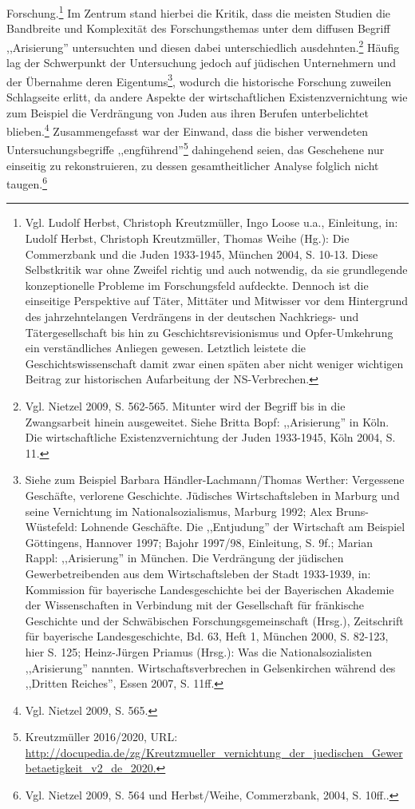 Forschung.\footnote{Vgl. Ludolf Herbst, Christoph Kreutzmüller, Ingo Loose u.a., Einleitung, in: Ludolf Herbst, Christoph Kreutzmüller, Thomas Weihe (Hg.): Die Commerzbank und die Juden 1933-1945, München 2004, S. 10-13. Diese Selbstkritik war ohne Zweifel richtig und auch notwendig, da sie grundlegende konzeptionelle Probleme im Forschungsfeld aufdeckte. Dennoch ist die einseitige Perspektive auf Täter, Mittäter und Mitwisser vor dem Hintergrund des jahrzehntelangen Verdrängens in der deutschen Nachkriegs- und Tätergesellschaft bis hin zu Geschichtsrevisionismus und Opfer-Umkehrung ein verständliches Anliegen gewesen. Letztlich leistete die Geschichtswissenschaft damit zwar einen späten aber nicht weniger wichtigen Beitrag zur historischen Aufarbeitung der NS-Verbrechen.} Im Zentrum stand hierbei die Kritik, dass die meisten Studien die Bandbreite und Komplexität des Forschungsthemas unter dem diffusen Begriff ,,Arisierung'' untersuchten und diesen dabei unterschiedlich ausdehnten.\footnote{Vgl. Nietzel 2009, S. 562-565. Mitunter wird der Begriff bis in die Zwangsarbeit hinein ausgeweitet. Siehe Britta Bopf: ,,Arisierung'' in Köln. Die wirtschaftliche Existenzvernichtung der Juden 1933-1945, Köln 2004, S. 11.} Häufig lag der Schwerpunkt der Untersuchung jedoch auf jüdischen Unternehmern und der Übernahme deren Eigentums\footnote{Siehe zum Beispiel Barbara Händler-Lachmann/Thomas Werther: Vergessene Geschäfte, verlorene Geschichte. Jüdisches Wirtschaftsleben in Marburg und seine Vernichtung im Nationalsozialismus, Marburg 1992; Alex Bruns-Wüstefeld: Lohnende Geschäfte. Die ,,Entjudung'' der Wirtschaft am Beispiel Göttingens, Hannover 1997; Bajohr 1997/98, Einleitung, S. 9f.; Marian Rappl: ,,Arisierung'' in München. Die Verdrängung der jüdischen Gewerbetreibenden aus dem Wirtschaftsleben der Stadt 1933-1939, in: Kommission für bayerische Landesgeschichte bei der Bayerischen Akademie der Wissenschaften in Verbindung mit der Gesellschaft für fränkische Geschichte und der Schwäbischen Forschungsgemeinschaft (Hrsg.), Zeitschrift für bayerische Landesgeschichte, Bd. 63, Heft 1, München 2000, S. 82-123, hier S. 125; Heinz-Jürgen Priamus (Hrsg.): Was die Nationalsozialisten ,,Arisierung'' nannten. Wirtschaftsverbrechen in Gelsenkirchen während des ,,Dritten Reiches'', Essen 2007, S. 11ff.}, wodurch die historische Forschung zuweilen Schlagseite erlitt, da andere Aspekte der wirtschaftlichen Existenzvernichtung wie zum Beispiel die Verdrängung von Juden aus ihren Berufen unterbelichtet blieben.\footnote{Vgl. Nietzel 2009, S. 565.} Zusammengefasst war der Einwand, dass die bisher verwendeten Untersuchungsbegriffe ,,engführend''\footnote{Kreutzmüller 2016/2020,  URL: \url{http://docupedia.de/zg/Kreutzmueller_vernichtung_der_juedischen_Gewerbetaetigkeit_v2_de_2020.}} dahingehend seien, das Geschehene nur einseitig zu rekonstruieren, zu dessen gesamtheitlicher Analyse folglich nicht taugen.\footnote{Vgl. Nietzel 2009, S. 564 und Herbst/Weihe, Commerzbank, 2004, S. 10ff..}

